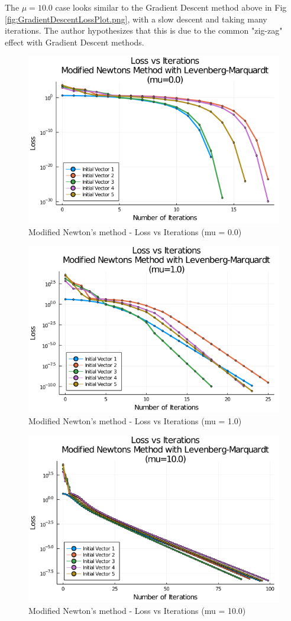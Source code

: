 \documentclass{article}
\begin{document}
    The $\mu = 10.0$ case looks similar to the Gradient Descent method above in Fig \ref{fig:GradientDescentLossPlot.png}, with a slow descent and taking many iterations. 
    The author hypothesizes that this is due to the common "zig-zag" effect with Gradient Descent methods.

    \begin{figure}[H]
        \centering
        \includegraphics[width=0.5\linewidth]{./ModifiedNewtons/ModifiedNewtonsWithLM_LossPlot_1.png}
        \caption{Modified Newton's method - Loss vs Iterations (mu = 0.0)}
        \label{fig:ModifiedNewtonsWithLM_LossPlot_1.png}
    \end{figure}
    
    \begin{figure}[H]
        \centering
        \includegraphics[width=0.5\linewidth]{./ModifiedNewtons/ModifiedNewtonsWithLM_LossPlot_2.png}
        \caption{Modified Newton's method - Loss vs Iterations (mu = 1.0)}
        \label{fig:ModifiedNewtonsWithLM_LossPlot_2.png}
    \end{figure}
    
    \begin{figure}[H]
        \centering
        \includegraphics[width=0.5\linewidth]{./ModifiedNewtons/ModifiedNewtonsWithLM_LossPlot_3.png}
        \caption{Modified Newton's method - Loss vs Iterations (mu = 10.0)}
        \label{fig:ModifiedNewtonsWithLM_LossPlot_3.png}
    \end{figure}
\end{document}
